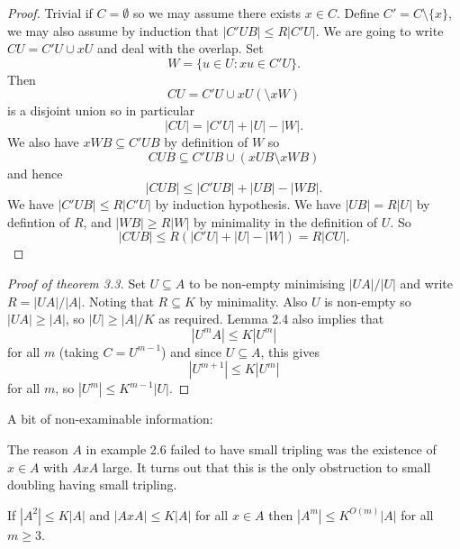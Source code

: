 \documentclass[a4paper]{article}
\begin{document}
\begin{proof}
  Trivial if \(C = \emptyset\) so we may assume there exists \(x \in C\). Define \(C' = C \setminus \{x\}\), we may also assume by induction that \(|C'UB| \leq R|C'U|\). We are going to write \(CU = C'U \cup xU\) and deal with the overlap. Set
  \[
    W = \{u \in U: xu \in C'U\}.
  \]
  Then
  \[
    CU = C'U \cup xU (\setminus xW)
  \]
  is a disjoint union so in particular
  \[
    |CU| = |C'U| + |U| - |W|.
  \]
  We also have \(xWB \subseteq C'UB\) by definition of \(W\) so
  \[
    CUB \subseteq C'UB \cup (xUB \setminus xWB)
  \]
  and hence
  \[
    |CUB| \leq |C'UB| + |UB| - |WB|.
  \]
  We have \(|C'UB| \leq R|C'U|\) by induction hypothesis. We have \(|UB| = R|U|\) by defintion of \(R\), and \(|WB| \geq R|W|\) by minimality in the definition of \(U\). So
  \[
    |CUB|
    \leq R(|C'U| + |U| - |W|)
    = R|CU|.
  \]
\end{proof}

\begin{proof}[Proof of theorem 3.3]
  Set \(U \subseteq A\) to be non-empty minimising \(|UA|/|U|\) and write \(R = |UA|/|A|\). Noting that \(R \subseteq K\) by minimality. Also \(U\) is non-empty so \(|UA| \geq |A|\), so \(|U| \geq |A|/K\) as required. Lemma 2.4 also implies that
  \[
    |U^mA| \leq K|U^m|
  \]
  for all \(m\) (taking \(C = U^{m - 1}\)) and since \(U \subseteq A\), this gives
  \[
    |U^{m + 1}| \leq K |U^m|
  \]
  for all \(m\), so \(|U^m| \leq K^{m - 1} |U|\).
\end{proof}

A bit of non-examinable information:

The reason \(A\) in example 2.6 failed to have small tripling was the existence of \(x \in A\) with \(AxA\) large. It turns out that this is the only obstruction to small doubling having small tripling.

\begin{theorem}
  If \(|A^2| \leq K|A|\) and \(|AxA| \leq K|A|\) for all \(x \in A\) then \(|A^m| \leq K^{O(m)}|A|\) for all \(m \geq 3\).
\end{theorem}


\printindex
\end{document}
